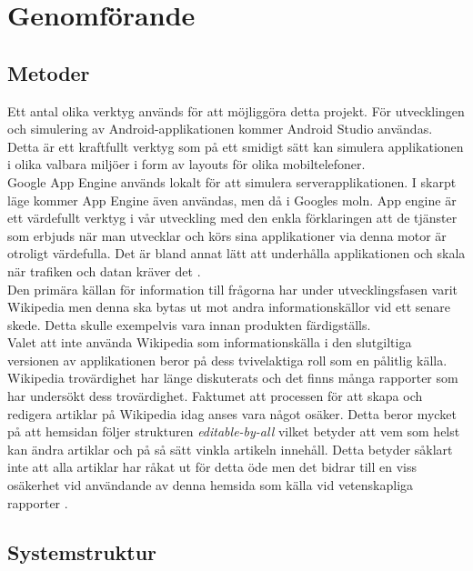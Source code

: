 \documentclass[a4paper, 11pt]{article}
\begin{document}
\section{Genomförande}

\subsection{Metoder}
Ett antal olika verktyg används för att möjliggöra detta projekt. För utvecklingen och simulering av Android-applikationen kommer Android Studio \cite{androidstudio} användas. Detta är ett kraftfullt verktyg som på ett smidigt sätt kan simulera applikationen i olika valbara miljöer i form av layouts för olika mobiltelefoner.\\
Google App Engine används lokalt för att simulera serverapplikationen. I skarpt läge kommer App Engine även användas, men då i Googles moln. App engine är ett värdefullt verktyg i vår utveckling med den enkla förklaringen att de tjänster som erbjuds när man utvecklar och körs sina applikationer via denna motor är otroligt värdefulla. Det är bland annat lätt att underhålla applikationen och skala när trafiken och datan kräver det  \cite{googleappengine}.\\
Den primära källan för information till frågorna har under utvecklingsfasen varit Wikipedia men denna ska bytas ut mot andra informationskällor vid ett senare skede. Detta skulle exempelvis vara innan produkten färdigställs.\\ 
Valet att inte använda Wikipedia som informationskälla i den slutgiltiga versionen av applikationen beror på dess tvivelaktiga roll som en pålitlig källa. Wikipedia trovärdighet har länge diskuterats och det finns många rapporter som har undersökt dess trovärdighet. Faktumet att processen för att skapa och redigera artiklar på Wikipedia idag anses vara något osäker. Detta beror mycket på att hemsidan följer strukturen \textit{editable-by-all} vilket betyder att vem som helst kan ändra artiklar och på så sätt vinkla artikeln innehåll. Detta betyder såklart inte att alla artiklar har råkat ut för detta öde men det bidrar till en viss osäkerhet vid användande av denna hemsida som källa vid vetenskapliga rapporter \cite{wikipediacred}.\\

\subsection{Systemstruktur}
\end{document}
